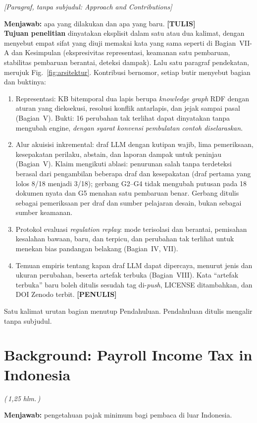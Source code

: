 \documentclass{ieeeaccess}
\newcommand{\TULIS}{\textcolor{sttulis}{\textbf{[TULIS]}}}
\newcommand{\PENULIS}{\textcolor{stpenulis}{\textbf{[PENULIS]}}}
\newcommand{\hal}[1]{\textcolor{draftblue}{\textit{(\,#1 hlm.\,)}}}
\newenvironment{isi}{\par\smallskip\footnotesize\color{draftblue}\noindent}{\par\smallskip\normalsize\color{black}}
\begin{document}
\noindent\textcolor{draftblue}{\textit{[Paragraf, tanpa subjudul: Approach and Contributions]}}
\begin{isi}
\textbf{Menjawab:} apa yang dilakukan dan apa yang baru. \TULIS{}\\
\textbf{Tujuan penelitian} dinyatakan eksplisit dalam satu atau dua kalimat, dengan menyebut empat sifat yang diuji memakai kata yang sama seperti di Bagian~VII-A dan Kesimpulan (ekspresivitas representasi, keamanan satu pembaruan, stabilitas pembaruan berantai, deteksi dampak). Lalu satu paragraf pendekatan, merujuk Fig.~\ref{fig:arsitektur}. Kontribusi bernomor, setiap butir menyebut bagian dan buktinya:
\begin{enumerate}
\item Representasi: KB bitemporal dua lapis berupa \textit{knowledge graph} RDF dengan aturan yang dieksekusi, resolusi konflik antarlapis, dan jejak sampai pasal (Bagian~V). Bukti: 16 perubahan tak terlihat dapat dinyatakan tanpa mengubah engine, \emph{dengan syarat konvensi pembulatan contoh diselaraskan}.
\item Alur akuisisi inkremental: draf LLM dengan kutipan wajib, lima pemeriksaan, kesepakatan perilaku, abstain, dan laporan dampak untuk peninjau (Bagian~V). Klaim mengikuti ablasi: penurunan salah tanpa terdeteksi berasal dari pengambilan beberapa draf dan kesepakatan (draf pertama yang lolos 8/18 menjadi 3/18); gerbang G2--G4 tidak mengubah putusan pada 18 dokumen nyata dan G5 menahan satu pembaruan benar. Gerbang ditulis sebagai pemeriksaan per draf dan sumber pelajaran desain, bukan sebagai sumber keamanan.
\item Protokol evaluasi \textit{regulation replay}: mode terisolasi dan berantai, pemisahan kesalahan bawaan, baru, dan terpicu, dan perubahan tak terlihat untuk menekan bias pandangan belakang (Bagian~IV, VII).
\item Temuan empiris tentang kapan draf LLM dapat dipercaya, menurut jenis dan ukuran perubahan, beserta artefak terbuka (Bagian~VIII). Kata ``artefak terbuka'' baru boleh ditulis sesudah tag di-\textit{push}, LICENSE ditambahkan, dan DOI Zenodo terbit. \PENULIS{}
\end{enumerate}
Satu kalimat urutan bagian menutup Pendahuluan. Pendahuluan ditulis mengalir tanpa subjudul.
\end{isi}

\section{Background: Payroll Income Tax in Indonesia}
\label{sec:latar}
\hal{1,25}
\begin{isi}
\textbf{Menjawab:} pengetahuan pajak minimum bagi pembaca di luar Indonesia.
\end{isi}
\end{document}
